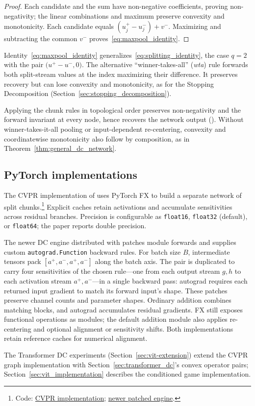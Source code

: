 \begin{proof}
Each candidate and the sum have non-negative coefficients, proving non-negativity; the linear combinations and maximum preserve convexity and monotonicity. Each candidate equals $(u_j^+-u_j^-)+v^-$. Maximizing and subtracting the common $v^-$ proves~\eqref{eq:maxpool_identity}.
\end{proof}

Identity~\eqref{eq:maxpool_identity} generalizes~\eqref{eq:splitting_identity}, the case $q = 2$ with the pair $\bigl( u^+ - u^-, 0 \bigr)$. The alternative ``winner-takes-all'' (\emph{wta}) rule forwards both split-stream values at the index maximizing their difference. It preserves recovery but can lose convexity and monotonicity, as for the Stopping Decomposition (Section~\ref{sec:stopping_decomposition}).

Applying the chunk rules in topological order preserves non-negativity and the forward invariant at every node, hence recovers the network output (). Without winner-takes-it-all pooling or input-dependent re-centering, convexity and coordinatewise monotonicity also follow by composition, as in Theorem~\ref{thm:general_dc_network}.

\subsection{PyTorch implementations}\label{subsec:split_implementations}

The CVPR implementation of \textcite{hiddenMono} uses PyTorch FX to build a separate network of split chunks.\footnote{Code: \href{https://github.com/JayPiZimmermann/DC-Decomposition-for-Explanability}{CVPR implementation}; \href{https://github.com/JayPiZimmermann/Playing_The_Network_Backward_Official_Repository}{newer patched engine}.} Explicit caches retain activations and accumulate sensitivities across residual branches. Precision is configurable as \texttt{float16}, \texttt{float32} (default), or \texttt{float64}; the paper reports double precision.

The newer DC engine distributed with \textcite{playingBackward2026} patches module forwards and supplies custom \texttt{autograd.Function} backward rules. For batch size $B$, intermediate tensors pack $[a^+,a^-,a^+,a^-]$ along the batch axis. The pair is duplicated to carry four sensitivities of the chosen rule---one from each output stream $g,h$ to each activation stream $a^+,a^-$---in a single backward pass: autograd requires each returned input gradient to match its forward input's shape. These patches preserve channel counts and parameter shapes. Ordinary addition combines matching blocks, and autograd accumulates residual gradients. FX still exposes functional operations as modules; the default addition module also applies re-centering and optional alignment or sensitivity shifts. Both implementations retain reference caches for numerical alignment.

The Transformer DC experiments (Section~\ref{sec:vit-extension}) extend the CVPR graph implementation with Section~\ref{sec:transformer_dc}'s convex operator pairs; Section~\ref{sec:vit_implementation} describes the conditioned game implementation.
